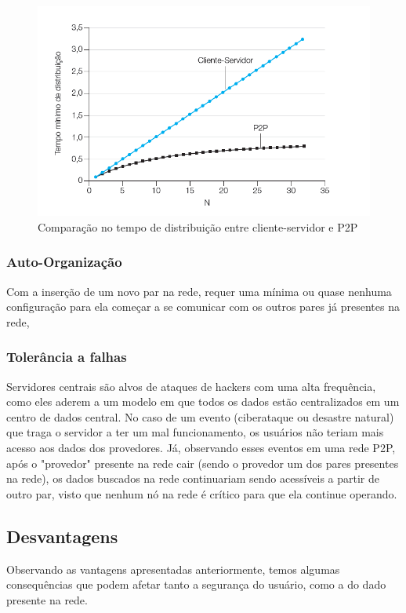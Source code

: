 \documentclass[a4paper]{article}
\begin{document}
\begin{figure}[!h]
	\begin{center}
		\includegraphics[scale=0.5]{img//p2p_distribution_time.png} 
		\caption{Comparação no tempo de distribuição entre cliente-servidor e P2P \cite{Kurose}}
	\end{center}
\end{figure}

\subsubsection{Auto-Organização}
Com a inserção de um novo par na rede, requer uma mínima ou quase nenhuma configuração para ela começar a se comunicar com os outros pares já presentes na rede,\cite{ACohenBAD}

\subsubsection{Tolerância a falhas} 
Servidores centrais são alvos de ataques de hackers com uma alta frequência, como eles aderem a um modelo em que todos os dados estão centralizados em um centro de dados central. No caso de um evento (ciberataque ou desastre natural) que traga o servidor a ter um mal funcionamento, os usuários não teriam mais acesso aos dados dos provedores. Já, observando esses eventos em uma rede P2P, após o "provedor" presente na rede cair (sendo o provedor um dos pares presentes na rede), os dados buscados na rede continuariam sendo acessíveis a partir de outro par, visto que nenhum nó na rede é crítico para que ela continue operando.\cite{ACohenBAD}

\subsection{Desvantagens}
Observando as vantagens apresentadas anteriormente, temos algumas consequências que podem afetar tanto a segurança do usuário, como a do dado presente na rede.
\end{document}
